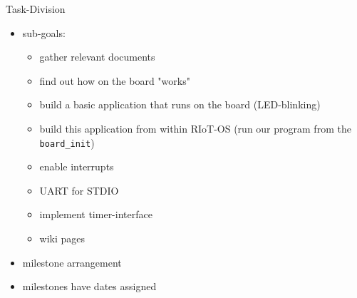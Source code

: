 \documentclass[9pt]{beamer}
\begin{document}
\begin{frame}{Task-Division}
\pause
 \begin{itemize}
 \item sub-goals:
\pause
 \begin{itemize}
 \item gather relevant documents
\pause
 \item find out how on the board "works"
\pause
 \item build a basic application that runs on the board (LED-blinking)
\pause
 \item build this application from within RIoT-OS (run our program from the \texttt{board\_init})
\pause
 \item enable interrupts
\pause
 \item UART for STDIO
\pause
 \item implement timer-interface
\pause
 \item wiki pages
\pause
 \end{itemize}
 \item milestone arrangement
\pause
 \item milestones have dates assigned
 \end{itemize}
\end{frame}
\end{document}
